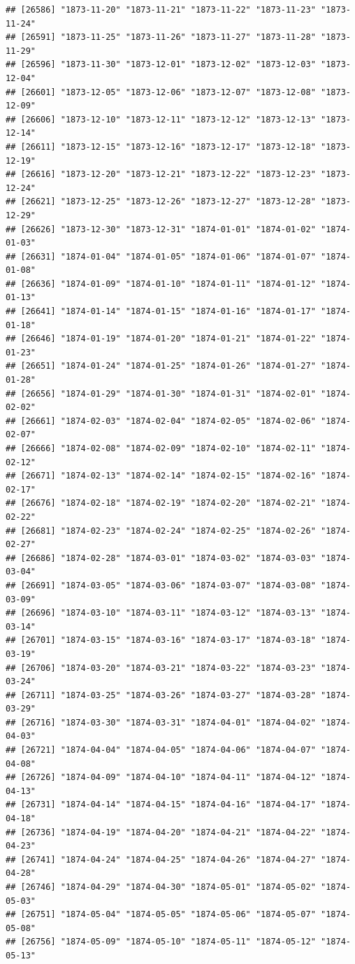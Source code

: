 \documentclass{article}\usepackage[]{graphicx}\usepackage[]{color}
\makeatletter
\newenvironment{kframe}{%
 \def\at@end@of@kframe{}%
 \ifinner\ifhmode%
  \def\at@end@of@kframe{\end{minipage}}%
  \begin{minipage}{\columnwidth}%
 \fi\fi%
 \def\FrameCommand##1{\hskip\@totalleftmargin \hskip-\fboxsep
 \colorbox{shadecolor}{##1}\hskip-\fboxsep
     \hskip-\linewidth \hskip-\@totalleftmargin \hskip\columnwidth}%
 \MakeFramed {\advance\hsize-\width
   \@totalleftmargin\z@ \linewidth\hsize
   \@setminipage}}%
 {\par\unskip\endMakeFramed%
 \at@end@of@kframe}
\newenvironment{knitrout}{}{} %
\makeatother
\begin{document}
\begin{description}
\begin{knitrout}
\begin{kframe}
\begin{verbatim}
## [26586] "1873-11-20" "1873-11-21" "1873-11-22" "1873-11-23" "1873-11-24"
## [26591] "1873-11-25" "1873-11-26" "1873-11-27" "1873-11-28" "1873-11-29"
## [26596] "1873-11-30" "1873-12-01" "1873-12-02" "1873-12-03" "1873-12-04"
## [26601] "1873-12-05" "1873-12-06" "1873-12-07" "1873-12-08" "1873-12-09"
## [26606] "1873-12-10" "1873-12-11" "1873-12-12" "1873-12-13" "1873-12-14"
## [26611] "1873-12-15" "1873-12-16" "1873-12-17" "1873-12-18" "1873-12-19"
## [26616] "1873-12-20" "1873-12-21" "1873-12-22" "1873-12-23" "1873-12-24"
## [26621] "1873-12-25" "1873-12-26" "1873-12-27" "1873-12-28" "1873-12-29"
## [26626] "1873-12-30" "1873-12-31" "1874-01-01" "1874-01-02" "1874-01-03"
## [26631] "1874-01-04" "1874-01-05" "1874-01-06" "1874-01-07" "1874-01-08"
## [26636] "1874-01-09" "1874-01-10" "1874-01-11" "1874-01-12" "1874-01-13"
## [26641] "1874-01-14" "1874-01-15" "1874-01-16" "1874-01-17" "1874-01-18"
## [26646] "1874-01-19" "1874-01-20" "1874-01-21" "1874-01-22" "1874-01-23"
## [26651] "1874-01-24" "1874-01-25" "1874-01-26" "1874-01-27" "1874-01-28"
## [26656] "1874-01-29" "1874-01-30" "1874-01-31" "1874-02-01" "1874-02-02"
## [26661] "1874-02-03" "1874-02-04" "1874-02-05" "1874-02-06" "1874-02-07"
## [26666] "1874-02-08" "1874-02-09" "1874-02-10" "1874-02-11" "1874-02-12"
## [26671] "1874-02-13" "1874-02-14" "1874-02-15" "1874-02-16" "1874-02-17"
## [26676] "1874-02-18" "1874-02-19" "1874-02-20" "1874-02-21" "1874-02-22"
## [26681] "1874-02-23" "1874-02-24" "1874-02-25" "1874-02-26" "1874-02-27"
## [26686] "1874-02-28" "1874-03-01" "1874-03-02" "1874-03-03" "1874-03-04"
## [26691] "1874-03-05" "1874-03-06" "1874-03-07" "1874-03-08" "1874-03-09"
## [26696] "1874-03-10" "1874-03-11" "1874-03-12" "1874-03-13" "1874-03-14"
## [26701] "1874-03-15" "1874-03-16" "1874-03-17" "1874-03-18" "1874-03-19"
## [26706] "1874-03-20" "1874-03-21" "1874-03-22" "1874-03-23" "1874-03-24"
## [26711] "1874-03-25" "1874-03-26" "1874-03-27" "1874-03-28" "1874-03-29"
## [26716] "1874-03-30" "1874-03-31" "1874-04-01" "1874-04-02" "1874-04-03"
## [26721] "1874-04-04" "1874-04-05" "1874-04-06" "1874-04-07" "1874-04-08"
## [26726] "1874-04-09" "1874-04-10" "1874-04-11" "1874-04-12" "1874-04-13"
## [26731] "1874-04-14" "1874-04-15" "1874-04-16" "1874-04-17" "1874-04-18"
## [26736] "1874-04-19" "1874-04-20" "1874-04-21" "1874-04-22" "1874-04-23"
## [26741] "1874-04-24" "1874-04-25" "1874-04-26" "1874-04-27" "1874-04-28"
## [26746] "1874-04-29" "1874-04-30" "1874-05-01" "1874-05-02" "1874-05-03"
## [26751] "1874-05-04" "1874-05-05" "1874-05-06" "1874-05-07" "1874-05-08"
## [26756] "1874-05-09" "1874-05-10" "1874-05-11" "1874-05-12" "1874-05-13"

\end{verbatim}
\end{kframe}
\end{knitrout}
\end{description}
\end{document}
